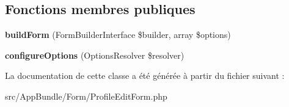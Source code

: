 \subsection*{Fonctions membres publiques}
\begin{DoxyCompactItemize}
\item 
\mbox{\label{classAppBundle_1_1Form_1_1ProfileEditForm_a9f70142b9d4ddce69f60c49499040a01}} 
{\bfseries build\+Form} (Form\+Builder\+Interface \$builder, array \$options)
\item 
\mbox{\label{classAppBundle_1_1Form_1_1ProfileEditForm_ab5aa7b78cf0f50661016c0afb3c81f88}} 
{\bfseries configure\+Options} (Options\+Resolver \$resolver)
\end{DoxyCompactItemize}


La documentation de cette classe a été générée à partir du fichier suivant \+:\begin{DoxyCompactItemize}
\item 
src/\+App\+Bundle/\+Form/Profile\+Edit\+Form.\+php\end{DoxyCompactItemize}
